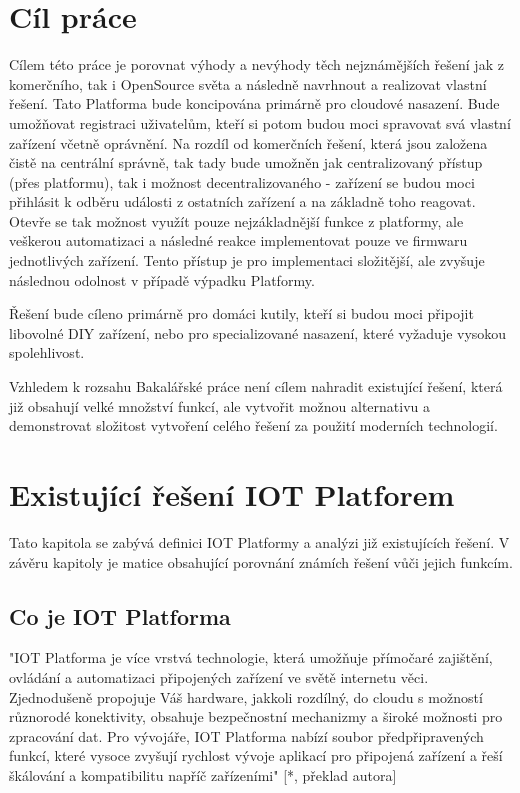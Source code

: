 \documentclass[thesis=B,czech]{FITthesis}[2019/12/23]
\begin{document}
\chapter{Cíl práce}
    Cílem této práce je porovnat výhody a nevýhody těch nejznámějších řešení jak z komerčního, tak i OpenSource světa a následně navrhnout a realizovat vlastní řešení. Tato Platforma bude koncipována primárně pro cloudové nasazení. Bude umožňovat registraci uživatelům, kteří si potom budou moci spravovat svá vlastní zařízení včetně oprávnění. Na rozdíl od komerčních řešení, která jsou založena čistě na centrální správně, tak tady bude umožněn jak centralizovaný přístup (přes platformu), tak i možnost decentralizovaného - zařízení se budou moci přihlásit k odběru události z ostatních zařízení a na základně toho reagovat. Otevře se tak možnost využít pouze nejzákladnější funkce z platformy, ale veškerou automatizaci a následné reakce implementovat pouze ve firmwaru jednotlivých zařízení. Tento přístup je pro implementaci složitější, ale zvyšuje následnou odolnost v případě výpadku Platformy.

    Řešení bude cíleno primárně pro domáci kutily, kteří si budou moci připojit libovolné DIY zařízení, nebo pro specializované nasazení, které vyžaduje vysokou spolehlivost.

    Vzhledem k rozsahu Bakalářské práce není cílem nahradit existující řešení, která již obsahují velké množství funkcí, ale vytvořit možnou alternativu a demonstrovat složitost vytvoření celého řešení za použití moderních technologií. 

    

\chapter{Existující řešení IOT Platforem}
Tato kapitola se zabývá definici IOT Platformy a analýzi již existujících řešení. V závěru kapitoly je matice obsahující porovnání známích řešení vůči jejich funkcím.

\section{Co je IOT Platforma}
    "IOT Platforma je více vrstvá technologie, která umožňuje přímočaré zajištění, ovládání a automatizaci připojených zařízení ve světě internetu věci. Zjednodušeně propojuje Váš hardware, jakkoli rozdílný, do cloudu s možností různorodé konektivity, obsahuje bezpečnostní mechanizmy a široké možnosti pro zpracování dat. Pro vývojáře, IOT Platforma nabízí soubor předpřipravených funkcí, které vysoce zvyšují rychlost vývoje aplikací pro připojená zařízení a řeší škálování a kompatibilitu napříč zařízeními" [*, překlad autora] %
\end{document}
